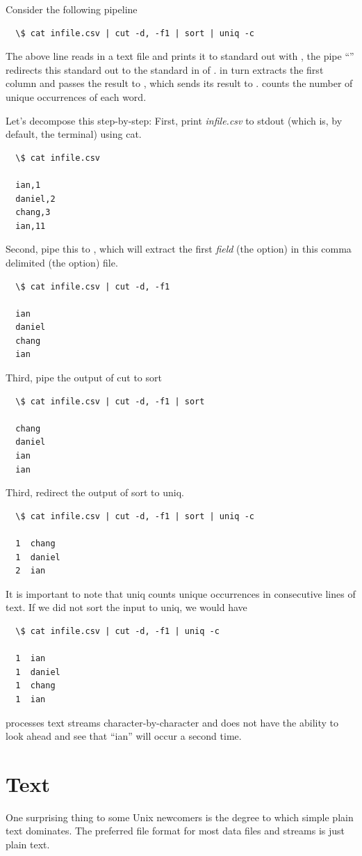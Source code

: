 Consider the following pipeline
\begin{verbatim}
  \$ cat infile.csv | cut -d, -f1 | sort | uniq -c
\end{verbatim}
The above line reads in a text file and prints it to standard out with , the pipe ``\textbar'' redirects this standard out to the standard in of .   in turn extracts the first column and passes the result to , which sends its result to .   counts the number of unique occurrences of each word.

Let's decompose this step-by-step:  First, print \emph{infile.csv} to stdout (which is, by default, the terminal) using cat.
\begin{verbatim}
  \$ cat infile.csv

  ian,1
  daniel,2
  chang,3
  ian,11
\end{verbatim}
Second, pipe this to , which will extract the first \emph{field} (the  option) in this comma delimited (the  option) file. 
\begin{verbatim}
  \$ cat infile.csv | cut -d, -f1

  ian
  daniel
  chang
  ian
\end{verbatim}
Third, pipe the output of cut to sort
\begin{verbatim}
  \$ cat infile.csv | cut -d, -f1 | sort

  chang
  daniel
  ian
  ian
\end{verbatim}
Third, redirect the output of sort to uniq.
\begin{verbatim}
  \$ cat infile.csv | cut -d, -f1 | sort | uniq -c

  1  chang
  1  daniel
  2  ian
\end{verbatim}
It is important to note that uniq counts unique occurrences in consecutive lines of text.  If we did not sort the input to uniq, we would have
\begin{verbatim}
  \$ cat infile.csv | cut -d, -f1 | uniq -c

  1  ian
  1  daniel
  1  chang
  1  ian
\end{verbatim}
 processes text streams character-by-character and does not have the ability to look ahead and see that ``ian'' will occur a second time.


\section{Text}
One surprising thing to some Unix newcomers is the degree to which simple plain text dominates.  The preferred file format for most data files and streams is just plain text.  

